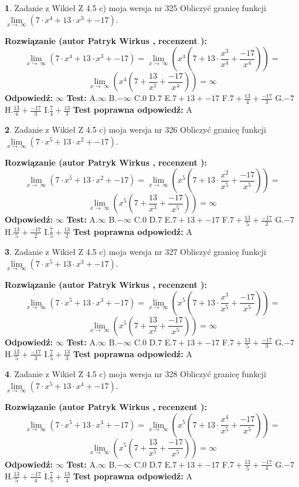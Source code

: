 \documentclass[12pt, a4paper]{article}
\theoremstyle{definition} %
\newtheorem{zad}{}
\newcommand{\zadStart}[1]{\begin{zad}#1\newline}
\newcommand{\zadStop}{\end{zad}}
\newcommand{\rozwStart}[2]{\noindent \textbf{Rozwiązanie (autor #1 , recenzent #2): }\newline}
\newcommand{\rozwStop}{\newline}
\newcommand{\odpStart}{\noindent \textbf{Odpowiedź:}\newline}
\newcommand{\odpStop}{\newline}
\newcommand{\testStart}{\noindent \textbf{Test:}\newline}
\newcommand{\testStop}{\newline}
\newcommand{\kluczStart}{\noindent \textbf{Test poprawna odpowiedź:}\newline}
\newcommand{\kluczStop}{\newline}
\begin{document}
\zadStart{Zadanie z Wikieł Z 4.5 c) moja wersja nr 325}
Obliczyć granicę funkcji  $\lim\limits_{x\to\ \infty}(7 \cdot x^{4}+13 \cdot x^{3}+-17)$.
\zadStop
\rozwStart{Patryk Wirkus}{}
$$\lim\limits_{x\to\ \infty}(7 \cdot x^{4}+13 \cdot x^{3}+-17) = \lim\limits_{x\to\ \infty}(x^{4}(7 +13 \cdot \frac{x^{3}}{x^{4}}+\frac{-17}{x^{4}})) =$$ $$\lim\limits_{x\to\ \infty}(x^{4}(7 +\frac{13}{x^{1}}+\frac{-17}{x^{4}})) =\infty$$
\rozwStop
\odpStart
$\infty$
\odpStop
\testStart
A.$\infty$ B.$-\infty$ C.$0$ D.$7$ E.$7 + 13 + -17$
F.$7+\frac{13}{4}+\frac{-17}{3}$ G.$-7$
H.$\frac{13}{4}+\frac{-17}{3}$
I.$\frac{7}{4}+\frac{13}{3}$
\testStop
\kluczStart
A
\kluczStop



\zadStart{Zadanie z Wikieł Z 4.5 c) moja wersja nr 326}
Obliczyć granicę funkcji  $\lim\limits_{x\to\ \infty}(7 \cdot x^{5}+13 \cdot x^{2}+-17)$.
\zadStop
\rozwStart{Patryk Wirkus}{}
$$\lim\limits_{x\to\ \infty}(7 \cdot x^{5}+13 \cdot x^{2}+-17) = \lim\limits_{x\to\ \infty}(x^{5}(7 +13 \cdot \frac{x^{2}}{x^{5}}+\frac{-17}{x^{5}})) =$$ $$\lim\limits_{x\to\ \infty}(x^{5}(7 +\frac{13}{x^{3}}+\frac{-17}{x^{5}})) =\infty$$
\rozwStop
\odpStart
$\infty$
\odpStop
\testStart
A.$\infty$ B.$-\infty$ C.$0$ D.$7$ E.$7 + 13 + -17$
F.$7+\frac{13}{5}+\frac{-17}{2}$ G.$-7$
H.$\frac{13}{5}+\frac{-17}{2}$
I.$\frac{7}{5}+\frac{13}{2}$
\testStop
\kluczStart
A
\kluczStop



\zadStart{Zadanie z Wikieł Z 4.5 c) moja wersja nr 327}
Obliczyć granicę funkcji  $\lim\limits_{x\to\ \infty}(7 \cdot x^{5}+13 \cdot x^{3}+-17)$.
\zadStop
\rozwStart{Patryk Wirkus}{}
$$\lim\limits_{x\to\ \infty}(7 \cdot x^{5}+13 \cdot x^{3}+-17) = \lim\limits_{x\to\ \infty}(x^{5}(7 +13 \cdot \frac{x^{3}}{x^{5}}+\frac{-17}{x^{5}})) =$$ $$\lim\limits_{x\to\ \infty}(x^{5}(7 +\frac{13}{x^{2}}+\frac{-17}{x^{5}})) =\infty$$
\rozwStop
\odpStart
$\infty$
\odpStop
\testStart
A.$\infty$ B.$-\infty$ C.$0$ D.$7$ E.$7 + 13 + -17$
F.$7+\frac{13}{5}+\frac{-17}{3}$ G.$-7$
H.$\frac{13}{5}+\frac{-17}{3}$
I.$\frac{7}{5}+\frac{13}{3}$
\testStop
\kluczStart
A
\kluczStop



\zadStart{Zadanie z Wikieł Z 4.5 c) moja wersja nr 328}
Obliczyć granicę funkcji  $\lim\limits_{x\to\ \infty}(7 \cdot x^{5}+13 \cdot x^{4}+-17)$.
\zadStop
\rozwStart{Patryk Wirkus}{}
$$\lim\limits_{x\to\ \infty}(7 \cdot x^{5}+13 \cdot x^{4}+-17) = \lim\limits_{x\to\ \infty}(x^{5}(7 +13 \cdot \frac{x^{4}}{x^{5}}+\frac{-17}{x^{5}})) =$$ $$\lim\limits_{x\to\ \infty}(x^{5}(7 +\frac{13}{x^{1}}+\frac{-17}{x^{5}})) =\infty$$
\rozwStop
\odpStart
$\infty$
\odpStop
\testStart
A.$\infty$ B.$-\infty$ C.$0$ D.$7$ E.$7 + 13 + -17$
F.$7+\frac{13}{5}+\frac{-17}{4}$ G.$-7$
H.$\frac{13}{5}+\frac{-17}{4}$
I.$\frac{7}{5}+\frac{13}{4}$
\testStop
\kluczStart
A
\kluczStop
\end{document}
